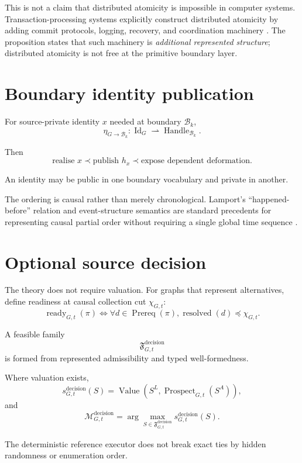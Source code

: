 \documentclass[11pt,a4paper]{article}
\theoremstyle{remark}
\begin{document}
This is not a claim that distributed atomicity is impossible in computer systems. Transaction-processing systems explicitly construct distributed atomicity by adding commit protocols, logging, recovery, and coordination machinery \citep{gray1993}. The proposition states that such machinery is \emph{additional represented structure}; distributed atomicity is not free at the primitive boundary layer.

\section{Boundary identity publication}\label{sec:publication}

For source-private identity $x$ needed at boundary $\mathcal B_k$,
\[
\eta_{G\rightarrow\mathcal B_k}:
\operatorname{Id}_G
\rightharpoonup
\operatorname{Handle}_{\mathcal B_k}.
\]

Then
\[
\text{realise }x
\prec
\text{publish }h_x
\prec
\text{expose dependent deformation}.
\]

An identity may be public in one boundary vocabulary and private in another.

The ordering is causal rather than merely chronological. Lamport's ``happened-before'' relation and event-structure semantics are standard precedents for representing causal partial order without requiring a single global time sequence \citep{lamport1978,winskel1987}.

\section{Optional source decision}\label{sec:decision}

The theory does not require valuation. For graphs that represent alternatives, define readiness at causal collection cut $\chi_{G,t}$:
\[
\operatorname{ready}_{G,t}(\pi)
\iff
\forall d\in\operatorname{Prereq}(\pi),
\operatorname{resolved}(d)\preceq\chi_{G,t}.
\]

A feasible family
\[
\mathfrak F_{G,t}^{\mathrm{decision}}
\]
is formed from represented admissibility and typed well-formedness.

Where valuation exists,
\[
s_{G,t}^{\mathrm{decision}}(S)
=
\operatorname{Value}
\left(
S^L,
\operatorname{Prospect}_{G,t}(S^A)
\right),
\]
and
\[
\mathcal M_{G,t}^{\mathrm{decision}}
=
\arg\max_{S\in\mathfrak F_{G,t}^{\mathrm{decision}}}
s_{G,t}^{\mathrm{decision}}(S).
\]

The deterministic reference executor does not break exact ties by hidden randomness or enumeration order.
\end{document}
